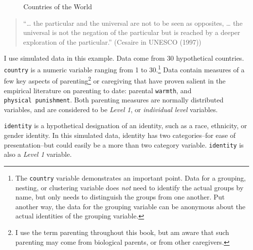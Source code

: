 \documentclass[
  letterpaper,
  DIV=11,
  numbers=noendperiod]{scrreprt}
\begin{document}
\begin{figure}


\caption{\label{fig-world}Countries of the World}

\end{figure}%

\begin{quote}
``\ldots{} the particular and the universal are not to be seen as
opposites, \ldots{} the universal is not the negation of the particular
but is reached by a deeper exploration of the particular.'' (Cesaire in
UNESCO (1997))  
\end{quote}

I use simulated data in this example. Data come from 30 hypothetical
countries. \texttt{country} is a numeric variable ranging from 1 to
30.\footnote{The \texttt{country} variable demonstrates an important
  point. Data for a grouping, nesting, or clustering variable does
  \emph{not} need to identify the actual groups by name, but only needs
  to distinguish the groups from one another. Put another way, the data
  for the grouping variable can be anonymous about the actual identities
  of the grouping variable.} Data contain measures of a few key aspects
of parenting\footnote{I use the term parenting throughout this book, but
  am aware that such parenting may come from biological parents, or from
  other caregivers.} or caregiving that have proven salient in the
empirical literature on parenting to date: parental \texttt{warmth}, and
\texttt{physical\ punishment}. Both parenting measures are normally
distributed variables, and are considered to be \emph{Level 1}, or
\emph{individual level} variables.

\texttt{identity} is a hypothetical designation of an identity, such as
a race, ethnicity, or gender identity. In this simulated data, identity
has two categories--for ease of presentation--but could easily be a more
than two category variable. \texttt{identity} is also a \emph{Level 1}
variable.
\end{document}
